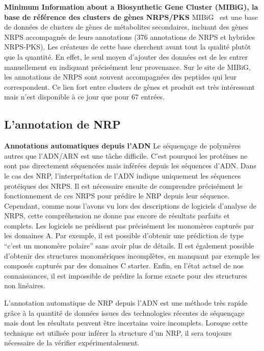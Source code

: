 \textbf{Minimum Information about a Biosynthetic Gene Cluster (MIBiG), la base de référence des clusters de gènes NRPS/PKS}
MIBiG~\cite{medema_minimum_2015} est une base de données de clusters de gènes de métabolites secondaires, incluant des gènes NRPS accompagnés de leurs annotations (376 annotations de NRPS et hybrides NRPS-PKS).
Les créateurs de cette base cherchent avant tout la qualité plutôt que la quantité.
En effet, le seul moyen d'ajouter des données est de les entrer manuellement en indiquant précisément leur provenance.
Sur le site de MIBiG, les annotations de NRPS sont souvent accompagnées des peptides qui leur correspondent.
Ce lien fort entre clusters de gènes et produit est très intéressant mais n'est disponible à ce jour que pour 67 entrées.



\subsection{L'annotation de NRP}

\textbf{Annotations automatiques depuis l'ADN}
Le séquençage de polymères autres que l'ADN/ARN est une tâche difficile.
C'est pourquoi les protéines ne sont pas directement séquencées mais inférées depuis les séquences d'ADN.
Dans le cas des NRP, l'interprétation de l'ADN indique uniquement les séquences protéiques des NRPS.
Il est nécessaire ensuite de comprendre précisément le fonctionnement de ces NRPS pour prédire le NRP depuis leur séquence.
Cependant, comme nous l'avons vu lors des descriptions de logiciels d'analyse de NRPS, cette compréhension ne donne pas encore de résultats parfaits et complets.
Les logiciels ne prédisent pas précisément les monomères capturés par les domaines A.
Par exemple, il est possible d'obtenir une prédiction de type ``c'est un monomère polaire'' sans avoir plus de détails.
Il est également possible d'obtenir des structures monomériques incomplètes, en manquant par exemple les composés capturés par des domaines C starter.
Enfin, en l'état actuel de nos connaissances, il est impossible de prédire la forme exacte pour des structures non linéaires.

L'annotation automatique de NRP depuis l'ADN est une méthode très rapide grâce à la quantité de données issues des technologies récentes de séquençage mais dont les résultats peuvent être incertains voire incomplets.
Lorsque cette technique est utilisée pour inférer la structure d'un NRP, il sera toujours nécessaire de la vérifier expérimentalement.


